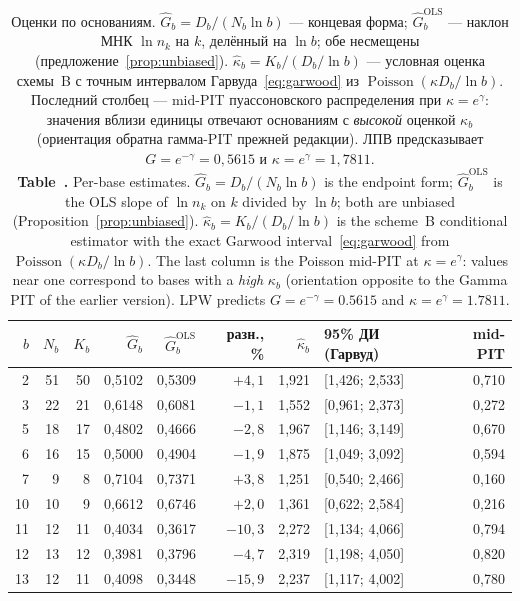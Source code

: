 \documentclass[11pt,a4paper]{article}
\newcommand{\encaptab}[1]{\\[3pt]\foreignlanguage{english}{%
  \textbf{Table~\thetable.} #1}}
\theoremstyle{plain}
\theoremstyle{remark}
\newcommand{\eg}{e^{\gamma}}
\newcommand{\emg}{e^{-\gamma}}
\DeclareMathOperator{\Pois}{Poisson}
\begin{document}
\begin{table}[t]
\centering
\caption{Оценки по основаниям. $\hat G_b=D_b/(N_b\ln b)$ --- концевая форма;
$\hat G_b^{\mathrm{OLS}}$ --- наклон МНК $\ln n_k$ на $k$, делённый на $\ln b$; обе
несмещены (предложение~\ref{prop:unbiased}). $\hat\kappa_b=K_b/(D_b/\ln b)$ ---
условная оценка схемы~B с точным интервалом Гарвуда~\eqref{eq:garwood} из
$\Pois(\kappa D_b/\ln b)$. Последний столбец --- mid-PIT пуассоновского
распределения при $\kappa=\eg$: значения вблизи единицы отвечают основаниям с
\emph{высокой} оценкой $\kappa_b$ (ориентация обратна гамма-PIT прежней
редакции). ЛПВ предсказывает $G=\emg=0{,}5615$ и $\kappa=\eg=1{,}7811$.
\encaptab{Per-base estimates. $\hat G_b=D_b/(N_b\ln b)$ is the endpoint form;
$\hat G_b^{\mathrm{OLS}}$ is the OLS slope of $\ln n_k$ on $k$ divided by $\ln b$;
both are unbiased (Proposition~\ref{prop:unbiased}).
$\hat\kappa_b=K_b/(D_b/\ln b)$ is the scheme~B conditional estimator with the
exact Garwood interval~\eqref{eq:garwood} from $\Pois(\kappa D_b/\ln b)$. The last
column is the Poisson mid-PIT at $\kappa=\eg$: values near one correspond to bases
with a \emph{high} $\kappa_b$ (orientation opposite to the Gamma PIT of the earlier
version). LPW predicts $G=\emg=0.5615$ and $\kappa=\eg=1.7811$.}}
\label{tab:bases}
\small
\begin{tabular}{rrrrrrrl r}
\toprule
$b$ & $N_b$ & $K_b$ & $\hat G_b$ & $\hat G_b^{\mathrm{OLS}}$ & разн., \% &
$\hat\kappa_b$ & 95\% ДИ (Гарвуд) & mid-PIT\\
\midrule
2 & 51 & 50 & 0{,}5102 & 0{,}5309 & $+4{,}1$ & 1{,}921 & [1{,}426; 2{,}533] & 0{,}710\\
3 & 22 & 21 & 0{,}6148 & 0{,}6081 & $-1{,}1$ & 1{,}552 & [0{,}961; 2{,}373] & 0{,}272\\
5 & 18 & 17 & 0{,}4802 & 0{,}4666 & $-2{,}8$ & 1{,}967 & [1{,}146; 3{,}149] & 0{,}670\\
6 & 16 & 15 & 0{,}5000 & 0{,}4904 & $-1{,}9$ & 1{,}875 & [1{,}049; 3{,}092] & 0{,}594\\
7 & 9 & 8 & 0{,}7104 & 0{,}7371 & $+3{,}8$ & 1{,}251 & [0{,}540; 2{,}466] & 0{,}160\\
10 & 10 & 9 & 0{,}6612 & 0{,}6746 & $+2{,}0$ & 1{,}361 & [0{,}622; 2{,}584] & 0{,}216\\
11 & 12 & 11 & 0{,}4034 & 0{,}3617 & $-10{,}3$ & 2{,}272 & [1{,}134; 4{,}066] & 0{,}794\\
12 & 13 & 12 & 0{,}3981 & 0{,}3796 & $-4{,}7$ & 2{,}319 & [1{,}198; 4{,}050] & 0{,}820\\
13 & 12 & 11 & 0{,}4098 & 0{,}3448 & $-15{,}9$ & 2{,}237 & [1{,}117; 4{,}002] & 0{,}780\\

\end{tabular}
\end{table}
\end{document}
